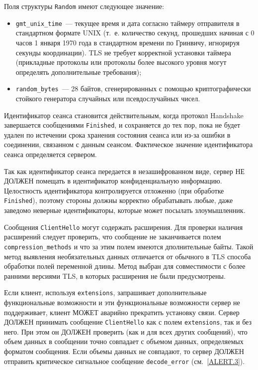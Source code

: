 Поля структуры \lstinline{Random} имеют следующее значение:
\begin{itemize}
\item[--]
\lstinline{gmt_unix_time}~--- текущее время и дата согласно таймеру 
отправителя в стандартном формате UNIX (т.~е. количество секунд, прошедших 
начиная с 0 часов 1 января 1970 года в стандартном времени по Гринвичу, 
игнорируя секунды координации). TLS не требует корректной установки 
таймера (прикладные протоколы или протоколы более высокого уровня могут 
определять дополнительные требования); 

\item[--]
\lstinline{random_bytes}~--- 28 байтов, сгенерированных с помощью 
криптографически стойкого генератора случайных или псевдослучайных чисел. 
\end{itemize}

Идентификатор сеанса становится действительным, когда протокол
Handshake завершается сообщениями \lstinline{Finished}, и
сохраняется до тех пор, пока не будет удален по истечении срока хранения
состояния сеанса или из-за ошибки в соединении, связанном с данным сеансом.
Фактическое значение идентификатора сеанса определяется сервером.

Так как идентификатор сеанса передается в незашифрованном виде, сервер НЕ
ДОЛЖЕН помещать в идентификатор конфиденциальную информацию. Целостность
идентификатора контролируется отложенно (при обработке
\lstinline{Finished}), поэтому стороны должны корректно обрабатывать любые,
даже заведомо неверные идентификаторы, которые может посылать
злоумышленник.

Сообщения \lstinline{ClientHello} могут содержать расширения. Для проверки наличия 
расширений следует проверить, что сообщение не заканчивается полем 
\lstinline{compression_methods} и что за этим полем имеются дполнительные байты. 
Такой метод выявления необязательных данных отличается от обычного в TLS 
способа обработки полей переменной длины. Метод выбран для совместимости с 
более ранними версиями TLS, в которых расширения не были предусмотрены. 
 
Если клиент, используя \lstinline{extensions}, запрашивает дополнительные
функциональные возможности и эти функциональные возможности сервер не
поддерживает, клиент МОЖЕТ аварийно прекратить установку связи. Сервер
ДОЛЖЕН принимать сообщение \lstinline{ClientHello} как с полем
\lstinline{extensions}, так и без него. При этом он ДОЛЖЕН проверить (как и
для всех других сообщений), что объем данных в сообщении точно совпадает с
объемом данных, определяемых форматом сообщения. Если объемы данных не
совпадают, то сервер ДОЛЖЕН отправить критическое сигнальное сообщение
\lstinline{decode_error} (см.~\ref{ALERT.3}).

